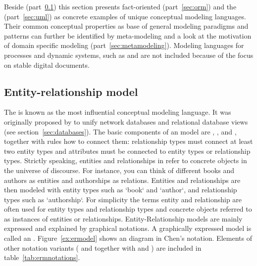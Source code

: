 Beside  (part~\ref{sec:erm}) this section presents fact-oriented
 (part~\ref{sec:orm}) and the  (part~\ref{sec:uml}) as concrete examples of unique
conceptual modeling languages. Their common conceptual properties as base of
general modeling paradigms and patterns can further be identified by
meta-modeling and a look at the motivation of domain specific modeling
(part~\ref{sec:metamodeling}). Modeling languages for processes and dynamic
systems, such as  and  are not included because of the focus on stable digital
documents.  

\subsection{Entity-relationship model}
\label{sec:erm}

The  is known as the most influential
conceptual modeling language. It was originally proposed by \textcite{Chen1976}
to unify network databases and relational database views (see
section~\ref{sec:databases}). The basic components of an  model are
, , and
, together with rules how to connect them: relationship types
must connect at least two entity types and attributes must be connected to
entity types or relationship types. Strictly speaking, entities and
relationships in  refer to concrete objects in the universe of
discourse. For instance, you can think of different books and authors as
entities and authorships as relations. Entities and relationships are then
modeled with entity types such as `book` and `author`, and relationship types
such as `authorship`. For simplicity the terms entity and relationship are
often used for entity types and relationship types and concrete objects referred
to as instances of entities or relationships.  Entity-Relationship models are
mainly expressed and explained by graphical notations.  A graphically
expressed model is called an .
Figure~\ref{ex:ermodel} shows an  diagram in Chen's notation.
Elements of other  notation variants ( and  together with  and ) are included in
table~\ref{tab:ermnotations}. 

